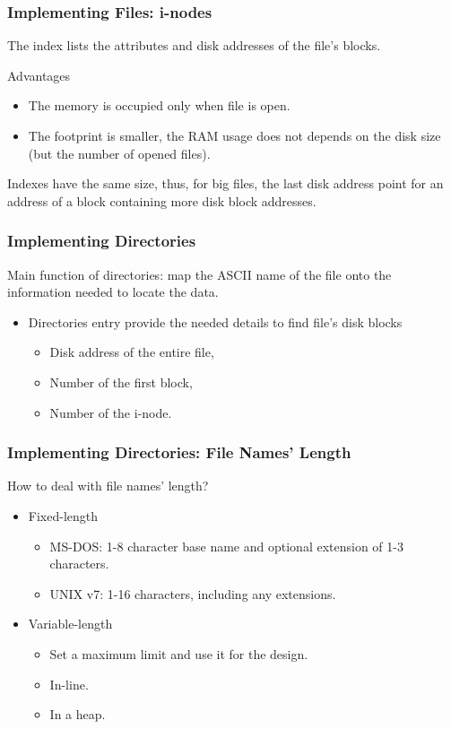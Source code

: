 \begin{frame}
    \frametitle{Implementing Files: i-nodes}
    The index lists the attributes and disk addresses of the file's blocks.
    \begin{block}{Advantages}
        \begin{itemize}
            \item The memory is occupied only when file is open.
            \item The footprint is smaller, the RAM usage does not depends on the disk size (but the number of opened files).
        \end{itemize}
    \end{block}
    Indexes have the same size, thus, for big files, the last disk address point for an address of a block containing more disk block addresses.
\end{frame}

\begin{frame}
    \frametitle{Implementing Directories}
    Main function of directories: map the ASCII name of the file onto the information needed to locate the data.
    \begin{itemize}
        \item Directories entry provide the needed details to find file's disk blocks
            \begin{itemize}
                \item Disk address of the entire file,
                \item Number of the first block,
                \item Number of the i-node.
            \end{itemize}
    \end{itemize}
\end{frame}

\begin{frame}
    \frametitle{Implementing Directories: File Names' Length}
    How to deal with file names' length?
    \begin{itemize}
        \item Fixed-length
        \begin{itemize}
            \item MS-DOS: 1-8 character base name and optional extension of 1-3 characters.
            \item UNIX v7: 1-16 characters, including any extensions.
        \end{itemize}
        \item Variable-length
        \begin{itemize}
            \item Set a maximum limit and use it for the design.
            \item In-line.
            \item In a heap.
        \end{itemize}
    \end{itemize}
\end{frame}

